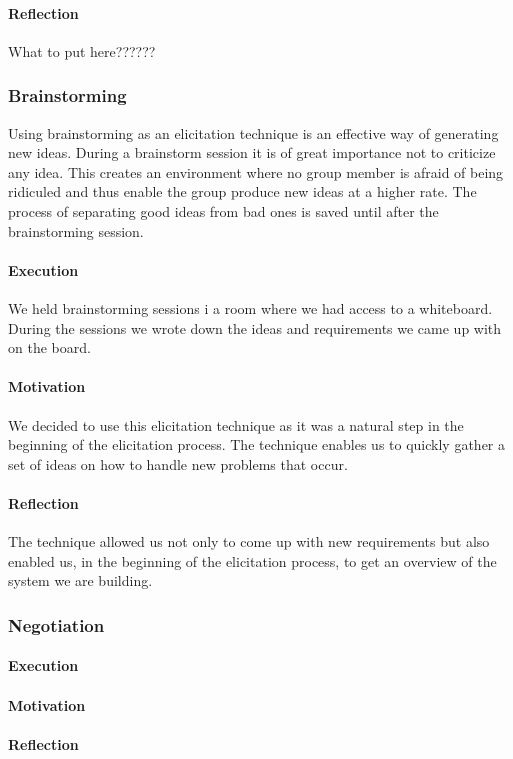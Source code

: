 \documentclass[10pt]{article}
\begin{document}
\paragraph{Reflection}
What to put here??????

\subsubsection{Brainstorming}
Using brainstorming as an elicitation technique is an effective way of generating new ideas. During a brainstorm session it is of great importance not to criticize any idea. This creates an environment where no group member is afraid of being ridiculed and thus enable the group produce new ideas at a higher rate.
The process of separating good ideas from bad ones is saved until after the brainstorming session. 
\paragraph{Execution}
We held brainstorming sessions i a room where we had access to a whiteboard. During the sessions we wrote down the ideas and requirements we came up with on the board.
\paragraph{Motivation}
We decided to use this elicitation technique as it was a natural step in the beginning of the elicitation process. The technique enables us to quickly gather a set of ideas on how to handle new problems that occur.
\paragraph{Reflection}
The technique allowed us not only to come up with new requirements but also enabled us, in the beginning of the elicitation process, to get an overview of the system we are building.


\subsubsection{Negotiation}
\paragraph{Execution}
\paragraph{Motivation}
\paragraph{Reflection}
\end{document}
